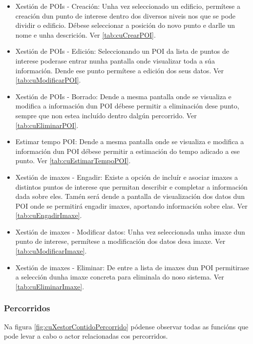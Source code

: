 \begin{itemize}
	\item Xestión de POIs - Creación: Unha vez seleccionado un edificio, permítese a creación dun punto de interese dentro dos diversos niveis nos que se pode dividir o edificio. Débese seleccionar a posición do novo punto e darlle un nome e unha descrición. Ver \ref{tab:cuCrearPOI}.
	\item Xestión de POIs - Edición: Seleccionando un POI da lista de puntos de interese poderase entrar nunha pantalla onde visualizar toda a súa información. Dende ese punto permítese a edición dos seus datos. Ver \ref{tab:cuModificarPOI}.
	\item Xestión de POIs - Borrado: Dende a mesma pantalla onde se visualiza e modifica a información dun POI débese permitir a eliminación dese punto, sempre que non estea incluído dentro dalgún percorrido. Ver \ref{tab:cuEliminarPOI}.
	\item Estimar tempo POI: Dende a mesma pantalla onde se visualiza e modifica a información dun POI débese permitir a estimación do tempo adicado a ese punto. Ver \ref{tab:cuEstimarTempoPOI}.
	\item Xestión de imaxes - Engadir: Existe a opción de incluír e asociar imaxes a distintos puntos de interese que permitan describir e completar a información dada sobre eles. Tamén será dende a pantalla de visualización dos datos dun POI onde se permitirá engadir imaxes, aportando información sobre elas. Ver \ref{tab:cuEngadirImaxe}.
	\item Xestión de imaxes - Modificar datos: Unha vez seleccionada unha imaxe dun punto de interese, permítese a modificación dos datos desa imaxe. Ver \ref{tab:cuModificarImaxe}.
	\item Xestión de imaxes - Eliminar: De entre a lista de imaxes dun POI permitirase a selección dunha imaxe concreta para eliminala do noso sistema. Ver \ref{tab:cuEliminarImaxe}.
\end{itemize}

\subsubsection{Percorridos}
Na figura \ref{fig:cuXestorContidoPercorrido} pódense observar todas as funcións que pode levar a cabo o actor relacionadas cos percorridos.


